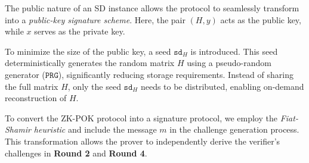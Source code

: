 \documentclass[11pt]{report}
\theoremstyle{definition}
\theoremstyle{plain}
\begin{document}
The public nature of an SD instance allows the protocol to seamlessly transform into a \textit{public-key signature scheme}. Here, the pair \((H, y)\) acts as the public key, while \(x\) serves as the private key.

To minimize the size of the public key, a seed \( \texttt{sd}_H \) is introduced. This seed deterministically generates the random matrix \(H\) using a pseudo-random generator (\(\texttt{PRG}\)), significantly reducing storage requirements. Instead of sharing the full matrix \(H\), only the seed \( \texttt{sd}_H \) needs to be distributed, enabling on-demand reconstruction of \(H\).

To convert the ZK-POK protocol into a signature protocol, we employ the \textit{Fiat-Shamir heuristic} and include the message \( m \) in the challenge generation process. This transformation allows the prover to independently derive the verifier's challenges in \textbf{Round 2} and \textbf{Round 4}.
\end{document}
